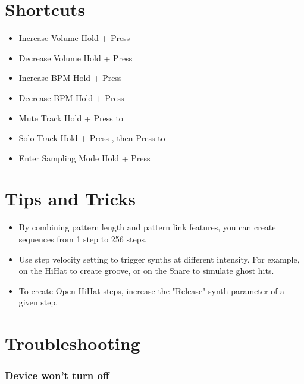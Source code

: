 \documentclass[8pt]{extarticle}
\begin{document}
\begin{multicols*}{3}
\section{Shortcuts}

\begin{itemize}
    \item[] Increase Volume \dotfill Hold  + Press 
    \item[] Decrease Volume \dotfill Hold  + Press 
    \item[] Increase BPM \dotfill Hold  + Press 
    \item[] Decrease BPM \dotfill Hold  + Press 
    \item[] Mute Track \dotfill Hold  + Press  to 
    \item[] Solo Track \dotfill Hold  + Press , then Press  to 
    \item[] Enter Sampling Mode \dotfill Hold  + Press 
\end{itemize}

\section{Tips and Tricks}

\begin{itemize}
    \item By combining pattern length and pattern link features, you can create sequences from 1 step to 256 steps.

    \item Use step velocity setting to trigger synths at different intensity. For example, on the HiHat to create groove, or on the Snare to simulate ghost hits.

    \item To create Open HiHat steps, increase the "Release" synth parameter of a given step.
\end{itemize}

\section{Troubleshooting}

\subsubsection{Device won't turn off}


\end{multicols*}
\end{document}

